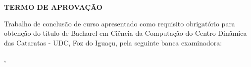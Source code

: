 \begin{folhadeaprovacao}
\begin{center}
	\vspace*{1cm}  
  	\large\textbf{TERMO DE APROVAÇÃO}
  	
  	\vspace*{1cm}
  	{\large\textbf\imprimirautor}

   \vspace*{1cm}
    {\large\textbf\imprimirtitulo}   
 \end{center}     
  
	
	\hspace{.4\textwidth}
	\SingleSpace\noindent\normalsize{Trabalho de conclusão de curso apresentado como requisito obrigatório para obtenção do título de Bacharel em Ciência da Computação do Centro Dinâmica das Cataratas - UDC, Foz do Iguaçu, pela seguinte banca examinadora:}
   
    
   \vspace*{0.5cm}  %
   \vspace*{2.5cm}
   \begin{center}
   	{\imprimirlocal, \ \imprimirdata}
   \end{center}
   
 
\end{folhadeaprovacao}